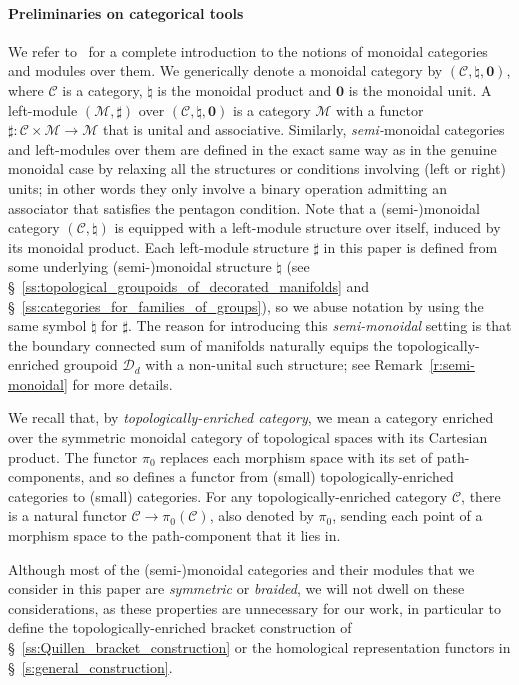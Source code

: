 \documentclass[AHL,Unicode,published]{cedram}
\newcommand{\zero}{\mathbf{0}}
\newcommand{\cC}{\mathcal{C}}
\newcommand{\cD}{\mathcal{D}}
\newcommand{\cM}{\mathcal{M}}
\begin{document}
\paragraph*{Preliminaries on categorical tools}
We refer to~\cite[Chap.~VII]{MacLane1} for a complete introduction to the notions of monoidal categories and modules over them. We generically denote a monoidal category by $(\cC,\natural,\zero)$, where $\cC$ is a category, $\natural$ is the monoidal product and $\zero$ is the monoidal unit. A left-module $(\cM,\sharp)$ over $(\cC,\natural,\zero)$ is a category $\cM$ with a functor $\sharp\colon\cC\times\cM\to\cM$ that is unital and associative. Similarly, \emph{semi-}monoidal categories and left-modules over them are defined in the exact same way as in the genuine monoidal case by relaxing all the structures or conditions involving (left or right) units; in other words they only involve a binary operation admitting an associator that satisfies the pentagon condition. Note that a (semi-)monoidal category $(\cC,\natural)$ is equipped with a left-module structure over itself, induced by its monoidal product. Each left-module structure $\sharp$ in this paper is defined from some underlying (semi-)monoidal structure $\natural$ (see \S~\ref{ss:topological_groupoids_of_decorated_manifolds} and \S~\ref{ss:categories_for_families_of_groups}), so we abuse notation by using the same symbol $\natural$ for $\sharp$. The reason for introducing this \emph{semi-monoidal} setting is that the boundary connected sum of manifolds naturally equips the topologically-enriched groupoid $\cD_{d}$ with a non-unital such structure; see Remark~\ref{r:semi-monoidal} for more details.

We recall that, by \emph{topologically-enriched category}, we mean a category enriched over the symmetric monoidal category of topological spaces with its Cartesian product. The functor $\pi_{0}$ replaces each morphism space with its set of path-components, and so defines a functor from (small) topologically-enriched categories to (small) categories. For any topologically-enriched category $\cC$, there is a natural functor $\cC \to \pi_{0}(\cC)$, also denoted by $\pi_{0}$, sending each point of a morphism space to the path-component that it lies in.

\begin{rema}\label{rmk:braidings_symmetries}
Although most of the (semi-)monoidal categories and their modules that we consider in this paper are \emph{symmetric} or \emph{braided}, we will not dwell on these considerations, as these properties are unnecessary for our work, in particular to define the topologically-enriched bracket construction of \S~\ref{ss:Quillen_bracket_construction} or the homological representation functors in \S~\ref{s:general_construction}.
\end{rema}
\end{document}
